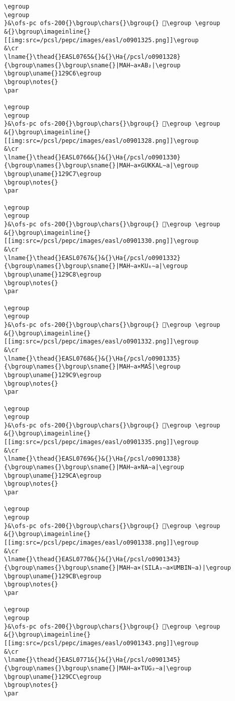 \begin{verbatim}
\egroup
\egroup
}&\ofs-pc ofs-200{}\bgroup\chars{}\bgroup{} 𒧅\egroup \egroup
&{}\bgroup\imageinline{}[[img:src=/pcsl/pepc/images/easl/o0901325.png]]\egroup
&\cr
\lname{}\thead{}EASL0765&{}&{}\Ha{/pcsl/o0901328}{\bgroup\names{}\bgroup\sname{}|MAH∼a×AB₂|\egroup
\bgroup\uname{}129C6\egroup
\bgroup\notes{}
\par 

\egroup
\egroup
}&\ofs-pc ofs-200{}\bgroup\chars{}\bgroup{} 𒧆\egroup \egroup
&{}\bgroup\imageinline{}[[img:src=/pcsl/pepc/images/easl/o0901328.png]]\egroup
&\cr
\lname{}\thead{}EASL0766&{}&{}\Ha{/pcsl/o0901330}{\bgroup\names{}\bgroup\sname{}|MAH∼a×GUKKAL∼a|\egroup
\bgroup\uname{}129C7\egroup
\bgroup\notes{}
\par 

\egroup
\egroup
}&\ofs-pc ofs-200{}\bgroup\chars{}\bgroup{} 𒧇\egroup \egroup
&{}\bgroup\imageinline{}[[img:src=/pcsl/pepc/images/easl/o0901330.png]]\egroup
&\cr
\lname{}\thead{}EASL0767&{}&{}\Ha{/pcsl/o0901332}{\bgroup\names{}\bgroup\sname{}|MAH∼a×KU₆∼a|\egroup
\bgroup\uname{}129C8\egroup
\bgroup\notes{}
\par 

\egroup
\egroup
}&\ofs-pc ofs-200{}\bgroup\chars{}\bgroup{} 𒧈\egroup \egroup
&{}\bgroup\imageinline{}[[img:src=/pcsl/pepc/images/easl/o0901332.png]]\egroup
&\cr
\lname{}\thead{}EASL0768&{}&{}\Ha{/pcsl/o0901335}{\bgroup\names{}\bgroup\sname{}|MAH∼a×MAŠ|\egroup
\bgroup\uname{}129C9\egroup
\bgroup\notes{}
\par 

\egroup
\egroup
}&\ofs-pc ofs-200{}\bgroup\chars{}\bgroup{} 𒧉\egroup \egroup
&{}\bgroup\imageinline{}[[img:src=/pcsl/pepc/images/easl/o0901335.png]]\egroup
&\cr
\lname{}\thead{}EASL0769&{}&{}\Ha{/pcsl/o0901338}{\bgroup\names{}\bgroup\sname{}|MAH∼a×NA∼a|\egroup
\bgroup\uname{}129CA\egroup
\bgroup\notes{}
\par 

\egroup
\egroup
}&\ofs-pc ofs-200{}\bgroup\chars{}\bgroup{} 𒧊\egroup \egroup
&{}\bgroup\imageinline{}[[img:src=/pcsl/pepc/images/easl/o0901338.png]]\egroup
&\cr
\lname{}\thead{}EASL0770&{}&{}\Ha{/pcsl/o0901343}{\bgroup\names{}\bgroup\sname{}|MAH∼a×(SILA₃∼a×UMBIN∼a)|\egroup
\bgroup\uname{}129CB\egroup
\bgroup\notes{}
\par 

\egroup
\egroup
}&\ofs-pc ofs-200{}\bgroup\chars{}\bgroup{} 𒧋\egroup \egroup
&{}\bgroup\imageinline{}[[img:src=/pcsl/pepc/images/easl/o0901343.png]]\egroup
&\cr
\lname{}\thead{}EASL0771&{}&{}\Ha{/pcsl/o0901345}{\bgroup\names{}\bgroup\sname{}|MAH∼a×TUG₂∼a|\egroup
\bgroup\uname{}129CC\egroup
\bgroup\notes{}
\par 


\end{verbatim}
